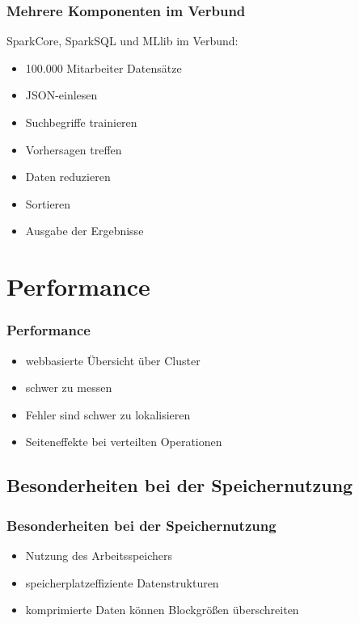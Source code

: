 \documentclass[hyperref={pdfpagelabels=false}]{beamer}
\begin{document}
\begin{frame} [t]
\frametitle{Mehrere Komponenten im Verbund}

SparkCore, SparkSQL und MLlib im Verbund: 
\begin{itemize}	
	\item 100.000 Mitarbeiter Datensätze
	\item JSON-einlesen	
	\item Suchbegriffe trainieren
	\item Vorhersagen treffen
	\item Daten reduzieren	
	\item Sortieren
	\item Ausgabe der Ergebnisse	
\end{itemize}

\end{frame}


\section{Performance}
\begin{frame} [t]
\frametitle{Performance}

\begin{itemize}
	\item webbasierte Übersicht über Cluster
	\item schwer zu messen
	\item Fehler sind schwer zu lokalisieren
	\item Seiteneffekte bei verteilten Operationen	
\end{itemize}

\end{frame}

 \subsection{Besonderheiten bei der Speichernutzung}
\begin{frame} [t]
\frametitle{Besonderheiten bei der Speichernutzung}

\begin{itemize}
	\item Nutzung des Arbeitsspeichers
	\item speicherplatzeffiziente Datenstrukturen
	\item komprimierte Daten können Blockgrößen überschreiten	
\end{itemize}

\end{frame}
\end{document}
